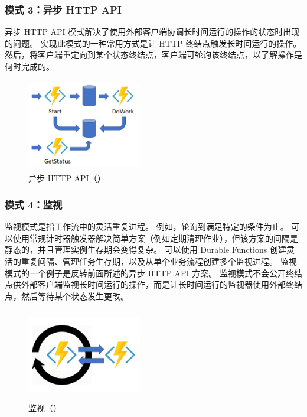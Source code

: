 \documentclass[11pt]{article}
\begin{document}
\subsubsection{模式 3：异步 HTTP API
}
异步 HTTP API 模式解决了使用外部客户端协调长时间运行的操作的状态时出现的问题。 实现此模式的一种常用方式是让 HTTP 终结点触发长时间运行的操作。 然后，将客户端重定向到某个状态终结点，客户端可轮询该终结点，以了解操作是何时完成的。
\begin{figure}[H]
\begin{flushleft}
\includegraphics[width=5cm, height=4cm]{figs/model3}
\caption{异步 HTTP API（\cite{Durable}）}
\end{flushleft}
\end{figure}

\subsubsection{模式 4：监视}
监视模式是指工作流中的灵活重复进程。 例如，轮询到满足特定的条件为止。 可以使用常规计时器触发器解决简单方案（例如定期清理作业），但该方案的间隔是静态的，并且管理实例生存期会变得复杂。 可以使用 Durable Functions 创建灵活的重复间隔、管理任务生存期，以及从单个业务流程创建多个监视进程。
监视模式的一个例子是反转前面所述的异步 HTTP API 方案。 监视模式不会公开终结点供外部客户端监视长时间运行的操作，而是让长时间运行的监视器使用外部终结点，然后等待某个状态发生更改。
\begin{figure}[H]
\begin{flushleft}
\includegraphics[width=5cm, height=4cm]{figs/model4}
\caption{监视（\cite{Durable}）}
\end{flushleft}
\end{figure}
\end{document}
